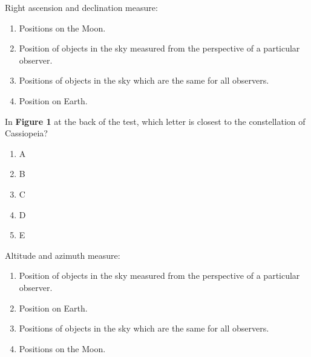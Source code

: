 \documentclass[11pt]{article}
\begin{document}
\begin{enumerate}
\begin{minipage}{\textwidth}
\begin{minipage}{\textwidth}
\end{minipage}
\end{minipage}
\vskip 0.20in

\begin{minipage}{\textwidth}
\begin{minipage}{\textwidth}
\item Right ascension and declination measure:
\begin{enumerate} 
\setlength{\itemsep}{1pt} 
\setlength{\parskip}{0pt} 
\setlength{\parsep}{0pt}
\setlength{\multicolsep}{1pt} 
\item Positions on the Moon.
\item Position of objects in the sky measured from the perspective of a particular observer.
\item Positions of objects in the sky which are the same for all observers.
\item Position on Earth.
\end{enumerate} 
\end{minipage}
\end{minipage}
\vskip 0.20in

\begin{minipage}{\textwidth}
\begin{minipage}{\textwidth}
\item In {\bf Figure 1} at the back of the test, which letter is closest to the constellation of  Cassiopeia?
\begin{multicols}{3}
\begin{enumerate} 
\setlength{\itemsep}{1pt} 
\setlength{\parskip}{0pt} 
\setlength{\parsep}{0pt}
\setlength{\multicolsep}{1pt} 
\item A
\item B
\item C
\item D
\item E
\end{enumerate} 
\vfill 
\end{multicols}

\end{minipage}
\end{minipage}
\vskip 0.20in

\begin{minipage}{\textwidth}
\begin{minipage}{\textwidth}
\item Altitude and azimuth measure:
\begin{enumerate} 
\setlength{\itemsep}{1pt} 
\setlength{\parskip}{0pt} 
\setlength{\parsep}{0pt}
\setlength{\multicolsep}{1pt} 
\item Position of objects in the sky measured from the perspective of a particular observer.
\item Position on Earth.
\item Positions of objects in the sky which are the same for all observers.
\item Positions on the Moon.
\end{enumerate} 
\end{minipage}
\end{minipage}
\vskip 0.20in


\end{enumerate}
\end{document}
